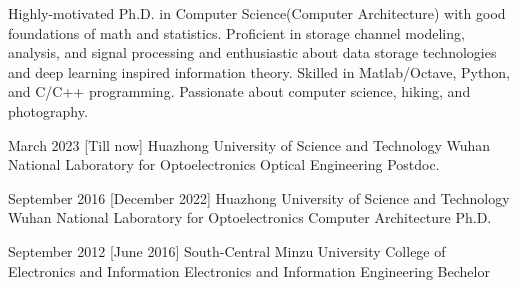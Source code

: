 \documentclass[en]{resume}
\begin{document}
\makeheader

Highly-motivated Ph.D. in Computer Science(Computer Architecture)
with good foundations of math and statistics.
Proficient in storage channel modeling, analysis, and signal processing
and enthusiastic about data storage technologies and deep learning inspired information theory.
Skilled in Matlab/Octave, Python, and C/C++ programming.
Passionate about computer science, hiking, and photography.


\begin{educations}
  \education%
  {March 2023}%
    [Till now]%
    {Huazhong University of Science and Technology}%
    {Wuhan National Laboratory for Optoelectronics}%
    {Optical Engineering}%
    {Postdoc.}

  \separator{0.5ex}
  \education%
    {September 2016}%
    [December 2022]%
    {Huazhong University of Science and Technology}%
    {Wuhan National Laboratory for Optoelectronics}%
    {Computer Architecture}%
    {Ph.D.}

    \separator{0.5ex}
  \education%
    {September 2012}%
    [June 2016]%
    {South-Central Minzu University}%
    {College of Electronics and Information}%
    {Electronics and Information Engineering}%
    {Bechelor}

\end{educations}
\end{document}
